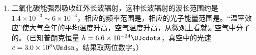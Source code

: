 \documentclass[\gkver]{gaokaozhenti}
\begin{document}
\begin{enumerate}
\onepicture[w=5.46cm]{}

{$Mg + 2mg$}
{$Mg + mg(\sin\alpha + \sin\beta)$}
{$Mg + mg(\cos\alpha + \cos\beta)$}


\item
二氧化碳能强烈吸收红外长波辐射，这种长波辐射的波长范围约是 $1.4\times10^{-3}\sim6\times10^{-3}$，相应的频率范围是\tkanswer[2.0cm]{}，相应的光子能量范围是\tkanswer[2.0cm]{}。“温室效应”使大气全年的平均温度升高，空气温度升高，从微观上看就是空气中分子的\tkanswer[2.2cm]{}。（已知普朗克恒量 $h=6.6\times10^{-34}\UJcdots$，真空中的光速 $c=3.0\times10^{8}\Umdsn$。结果取两位数字。）

\end{enumerate}
\end{document}
